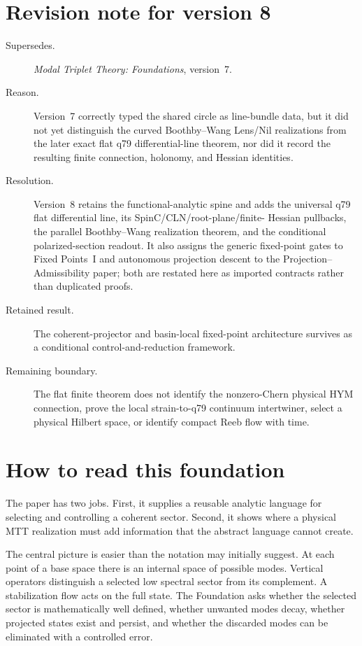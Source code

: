 \documentclass[11pt]{article}
\begin{document}
\section*{Revision note for version 8}
\begin{description}
\item[Supersedes.] \emph{Modal Triplet Theory: Foundations}, version~7.
\item[Reason.] Version~7 correctly typed the shared circle as line-bundle
data, but it did not yet distinguish the curved Boothby--Wang Lens/Nil
realizations from the later exact flat q79 differential-line theorem, nor did
it record the resulting finite connection, holonomy, and Hessian identities.
\item[Resolution.] Version~8 retains the functional-analytic spine and adds
the universal q79 flat differential line, its SpinC/CLN/root-plane/finite-
Hessian pullbacks, the parallel Boothby--Wang realization theorem, and the
conditional polarized-section readout. It also assigns the generic
fixed-point gates to Fixed Points~I and autonomous projection descent to the
Projection--Admissibility paper; both are restated here as imported contracts
rather than duplicated proofs.
\item[Retained result.] The coherent-projector and basin-local fixed-point
architecture survives as a conditional control-and-reduction framework.
\item[Remaining boundary.] The flat finite theorem does not identify the
nonzero-Chern physical HYM connection, prove the local strain-to-q79 continuum
intertwiner, select a physical Hilbert space, or identify compact Reeb flow
with time.
\end{description}

\tableofcontents

\section{How to read this foundation}

The paper has two jobs. First, it supplies a reusable analytic language for
selecting and controlling a coherent sector. Second, it shows where a
physical MTT realization must add information that the abstract language
cannot create.

The central picture is easier than the notation may initially suggest. At
each point of a base space there is an internal space of possible modes.
Vertical operators distinguish a selected low spectral sector from its
complement. A stabilization flow acts on the full state. The Foundation asks
whether the selected sector is mathematically well defined, whether unwanted
modes decay, whether projected states exist and persist, and whether the
discarded modes can be eliminated with a controlled error.
\end{document}
